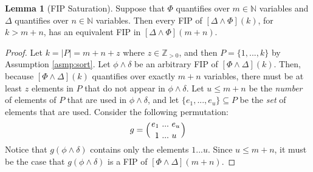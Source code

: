 \documentclass[12pt]{article}
\theoremstyle{definition}
\newtheorem{lemma}{Lemma}
\theoremstyle{remark}
\newcommand{\msp}{\text{ }}
\newcommand{\perm}{\genfrac{}{}{0pt}{}}
\begin{document}
\begin{lemma}[FIP Saturation]
  \label{lem:fip-sat}
  Suppose that $\Phi$ quantifies over $m \in \mathbb{N}$ variables and $\Delta$ quantifies over $n \in \mathbb{N}$ variables.  Then every FIP of $[\Delta \land \Phi](k)$, for $k > m+n$, has an equivalent FIP in $[\Delta \land \Phi](m+n)$.
\end{lemma}
\begin{proof}
  Let $k = |P| = m + n + z$ where $z \in \mathbb{Z}_{>0}$, and then $P = \{1,...,k\}$ by Assumption \ref{asmp:sort}.  Let $\phi\land\delta$ be an arbitrary FIP of $[\Phi\land\Delta](k)$.  Then, because $[\Phi\land\Delta](k)$ quantifies over exactly $m+n$ variables, there must be at least $z$ elements in $P$ that do not appear in $\phi\land\delta$.  Let $u \leq m+n$ be the \textit{number} of elements of $P$ that are used in $\phi \land \delta$, and let $\{e_1,...,e_u\} \subseteq P$ be the \textit{set} of elements that are used.  Consider the following permutation:
  $$g = \left(\perm{e_1 \msp ... \msp e_u}{1 \msp ... \msp u}\right)$$
  Notice that $g(\phi\land\delta)$ contains only the elements $1 ... u$.  Since $u \leq m+n$, it must be the case that $g(\phi\land\delta)$ is a FIP of $[\Phi \land \Delta](m+n)$.
\end{proof}
\end{document}
